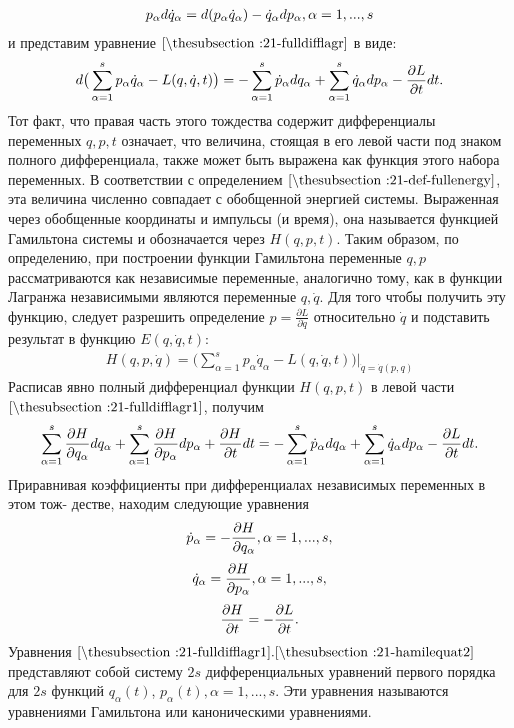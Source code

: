\documentclass[__main__.tex]{subfiles}
\begin{document}
	\begin{gather*}
	p_\alpha d\dot{q}_\alpha = d(p_\alpha \dot{q}_\alpha) - \dot{q}_\alpha dp_\alpha,\space \alpha = 1,...,s
	\end{gather*}
	и представим уравнение $\lref{21-fulldifflagr}$ в виде:
	\begin{gather}
	\llabel{21-fulldifflagr1}
	d\big(\sum_{\alpha=1}^{s}p_\alpha \dot{q}_\alpha - L(q, \dot{q}, t)\big) = -\sum_{\alpha=1}^{s}\dot{p}_\alpha dq_\alpha + \sum_{\alpha=1}^{s}\dot{q}_\alpha dp_\alpha - \frac{\partial{L}}{\partial{t}}dt.
	\end{gather}
	Тот факт, что правая часть этого тождества содержит дифференциалы переменных $q, p, t$ означает, что величина, стоящая в его левой части под знаком полного дифференциала, также может быть выражена как функция этого набора переменных. В соответствии с определением $\lref{21-def-fullenergy}$, эта величина численно совпадает с обобщенной энергией системы. Выраженная через обобщенные координаты и импульсы (и время), она называется функцией Гамильтона системы и обозначается через $H(q, p, t)$. Таким образом, по определению, при построении функции Гамильтона переменные $q, p$ рассматриваются как независимые переменные, аналогично тому, как в функции Лагранжа независимыми являются переменные $q, \dot{q}$. Для того чтобы получить эту функцию, следует разрешить определение $p=\frac{\partial{L}}{\partial{\dot{q}}}$ относительно $\dot{q}$ и подставить результат в функцию $E(q,\dot{q},t)$:
	\begin{gather*}
	H(q,p,\dot{q}) = \big(\sum_{\alpha=1}^{s}p_\alpha\dot{q}_\alpha - L(q,\dot{q},t)\big)\big|_{\dot{q}=\dot{q}(p,q)}
	\end{gather*}
	Расписав явно полный дифференциал функции $H(q, p, t)$ в левой части $\lref{21-fulldifflagr1}$, получим
	\begin{gather}
	\llabel{21-fulldiffH}
	\sum_{\alpha=1}^{s}\frac{\partial{H}}{\partial{q_\alpha}}dq_\alpha + \sum_{\alpha=1}^{s}\frac{\partial{H}}{\partial{p_\alpha}}dp_\alpha + \frac{\partial{H}}{\partial{t}}dt = -\sum_{\alpha=1}^{s}\dot{p}_\alpha dq_\alpha + \sum_{\alpha=1}^{s}\dot{q}_\alpha dp_\alpha - \frac{\partial{L}}{\partial{t}}dt.
	\end{gather}
	Приравнивая коэффициенты при дифференциалах независимых переменных в этом тож-
	дестве, находим следующие уравнения
	\begin{gather}
	\llabel{21-hamiltequat1}
	\dot{p}_\alpha = -\frac{\partial{H}}{\partial{q_\alpha}}, \space \alpha = 1,...,s,
	\end{gather}
	\begin{gather}
	\llabel{21-hamilequat2}
	\dot{q}_\alpha = \frac{\partial{H}}{\partial{p_\alpha}}, \space \alpha = 1,...,s,
	\end{gather}
	\begin{gather}
	\llabel{21-hamilequat3}
	\frac{\partial{H}}{\partial{t}} = -\frac{\partial{L}}{\partial{t}}.
	\end{gather}
	Уравнения $\lref{21-fulldifflagr1}. \lref{21-hamilequat2}$ представляют собой систему $2s$ дифференциальных уравнений первого порядка для $2s$ функций $q_α(t)$, $p_α(t), α = 1, ..., s$. Эти уравнения называются уравнениями
	Гамильтона или каноническими уравнениями.\\
	
\end{document}
